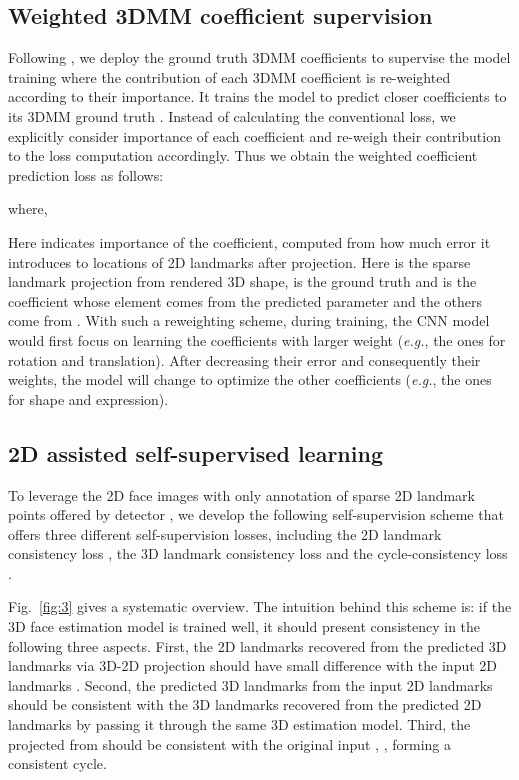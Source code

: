 \documentclass[10pt,twocolumn,letterpaper]{article}
\begin{document}
{\subsection{Weighted 3DMM coefficient supervision}
Following \cite{zhu2016face}, we deploy the ground truth 3DMM coefficients to supervise the model training where the contribution of each 3DMM coefficient is re-weighted according to their importance. It trains the model to predict closer coefficients  to its 3DMM ground truth .
Instead of calculating the conventional  loss, we  explicitly consider importance of each coefficient and re-weigh their contribution to the loss computation accordingly. Thus we obtain the {weighted coefficient prediction loss} as follows:

where,

Here  indicates  importance of the  coefficient, computed from how much error it introduces to locations of 2D landmarks after projection. Here  is the sparse landmark projection from rendered 3D shape,  is the ground truth and  is the coefficient whose  element comes from the predicted parameter and the others come from . With such a reweighting scheme, during training, the CNN model would first focus on learning the coefficients with larger weight (\textit{e.g.}, the ones for rotation and translation). After decreasing their error and consequently their weights, the model will change to optimize the other coefficients (\textit{e.g.}, the ones for shape and expression).

\subsection{2D assisted  self-supervised learning}
To leverage the  2D face images with only annotation of sparse 2D landmark points offered by detector \cite{bulat2017far}, we develop the following  self-supervision scheme that offers three different self-supervision losses, including the 2D landmark consistency loss , the 3D landmark consistency loss  and the cycle-consistency loss .

Fig.~\ref{fig:3} gives a systematic overview. The intuition behind this scheme is: if the 3D face estimation model is trained  well, it should present   consistency in the following three aspects. First, the  2D landmarks  recovered  from the predicted   3D landmarks  via 3D-2D projection should have small difference with the  input 2D landmarks . Second, the predicted 3D landmarks  from the input 2D landmarks  should be consistent with  the 3D landmarks  recovered from the predicted 2D landmarks    by passing it through the same 3D estimation model. Third, the projected  from   should be consistent with the original input , \ie, forming a consistent cycle.



}
\end{document}
